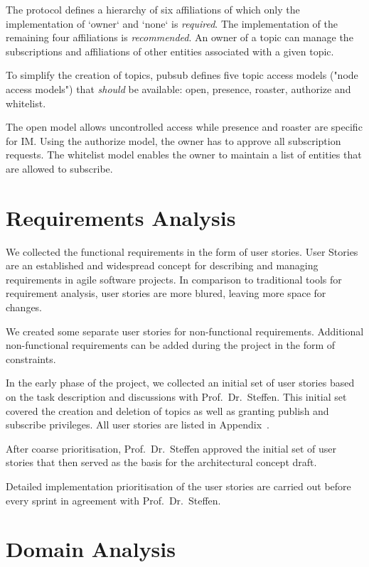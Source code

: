 The protocol defines a hierarchy of six affiliations of which only the implementation of `owner` and `none` is \emph{required}.
The implementation of the remaining four affiliations is \emph{recommended}.
An owner of a topic can manage the subscriptions and affiliations of other entities associated with a given topic.

To simplify the creation of topics, \gls{pubsub} defines five topic access models ("node access models") that \emph{should} be available: open, presence, roaster, authorize and whitelist.

The open model allows uncontrolled access while presence and roaster are specific for IM. Using the authorize model, the owner has to approve all subscription requests. The whitelist model enables the owner to maintain a list of entities that are allowed to subscribe.

\section{Requirements Analysis}

We collected the functional requirements in the form of user stories.
User Stories are an established and widespread concept for describing and managing requirements in agile software projects.
In comparison to traditional tools for requirement analysis, user stories are more blured, leaving more space for changes. \cite{wirdemann2017scrum}

We created some separate user stories for non-functional requirements.
Additional non-functional requirements can be added during the project in the form of constraints. \cite{wirdemann2017scrum}

In the early phase of the project, we collected an initial set of user stories based on the task description and discussions with Prof.\ Dr.\ Steffen.
This initial set covered the creation and deletion of topics as well as  granting publish and subscribe privileges.
All user stories are listed in Appendix~.

After coarse prioritisation, Prof.\ Dr.\ Steffen approved the initial set of user stories that then served as the basis for the architectural concept draft.

Detailed implementation prioritisation of the user stories are carried out before every sprint in agreement with Prof.\ Dr.\ Steffen.

\section{Domain Analysis}

